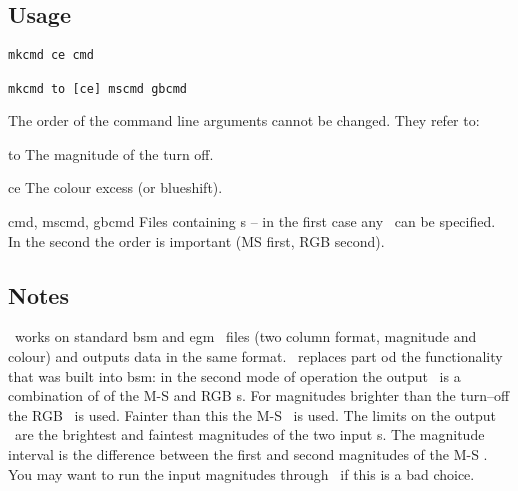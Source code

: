 \documentclass[11pt,twoside]{article}
\begin{document}
\subsection*{Usage}

\begin{verbatim}
mkcmd ce cmd

mkcmd to [ce] mscmd gbcmd
\end{verbatim}

\nin
The order of the command line arguments cannot be changed. They refer to:
\medskip

\begin{clo}{to}
The magnitude of the turn off.
\end{clo}

\begin{clo}{ce}
The colour excess (or blueshift).
\end{clo}

\begin{clo}{cmd, mscmd, gbcmd}
Files containing \cmd s -- in the first case any \cmd\ can be specified. In 
the second the order is important (MS first, RGB second).
\end{clo}

\subsection*{Notes}

\mkcmd\ works on standard {\sc bsm} and {\sc egm} \cmd\ files (two column
format, magnitude and colour) and outputs data in the same format. \mkcmd\
replaces part od the functionality that was built into {\sc bsm}: in the
second mode of operation the output \cmd\ is a combination of of the M-S
and RGB \cmd s. For magnitudes brighter than the turn--off the RGB \cmd\ is
used. Fainter than this the M-S \cmd\ is used. The limits on the output \cmd\
are the brightest and faintest magnitudes of the two input \cmd s. The 
magnitude interval is the difference between the first and second magnitudes
of the M-S \cmd. You may want to run the input magnitudes through \mkspl\ if
this is a bad choice.

\end{document}
